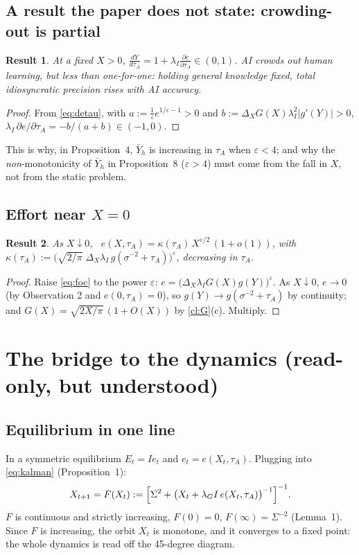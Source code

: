 \documentclass[11pt,a4paper]{article}
\newtheorem{result}{Result}
\theoremstyle{definition}
\theoremstyle{remark}
\newcommand{\tA}{\tau_A}
\newcommand{\lI}{\lambda_I}
\newcommand{\lG}{\lambda_G}
\begin{document}
\subsection{A result the paper does not state: crowding-out is partial}
\begin{result}\label{res:partial}
At a fixed $X>0$, $\displaystyle \frac{dY}{d\tA}=1+\lI\frac{\partial e}{\partial\tA}\in(0,1)$.
AI crowds out human learning, but less than one-for-one: holding general knowledge fixed, total
idiosyncratic precision rises with AI accuracy.
\end{result}
\begin{proof}
From \eqref{eq:detau}, with $a:=\tfrac1\varepsilon e^{1/\varepsilon-1}>0$ and $b:=\Delta_XG(X)\lI^2|g'(Y)|>0$,
$\lI\,\partial e/\partial\tA=-b/(a+b)\in(-1,0)$.
\end{proof}
\noindent This is why, in Proposition~4, $\bar Y_h$ is increasing in $\tA$ when $\varepsilon<4$; and why the
\emph{non}-monotonicity of $\bar Y_h$ in Proposition~8 ($\varepsilon>4$) must come from the fall in $X$, not
from the static problem.

\subsection{Effort near $X=0$}
\begin{result}\label{res:small}
As $X\downarrow0$, \ $e(X,\tA)=\kappa(\tA)\,X^{\varepsilon/2}\,(1+o(1))$, with
$\kappa(\tA):=\bigl(\sqrt{2/\pi}\;\Delta_X\lI\,g(\sigma^{-2}+\tA)\bigr)^{\varepsilon}$, decreasing in $\tA$.
\end{result}
\begin{proof}
Raise \eqref{eq:foc} to the power $\varepsilon$: $e=\bigl(\Delta_X\lI G(X)g(Y)\bigr)^\varepsilon$. As
$X\downarrow0$, $e\to0$ (by Observation 2 and $e(0,\tA)=0$), so $g(Y)\to g(\sigma^{-2}+\tA)$ by continuity; and
$G(X)=\sqrt{2X/\pi}\,(1+O(X))$ by \cref{cl:G}(c). Multiply.
\end{proof}

\section{The bridge to the dynamics (read-only, but understood)}

\subsection{Equilibrium in one line}
In a symmetric equilibrium $E_t=Ie_t$ and $e_t=e(X_t,\tA)$. Plugging into \eqref{eq:kalman}
(Proposition~1):
\[
X_{t+1}=F(X_t):=\Bigl[\Sigma^2+\bigl(X_t+\lG I\,e(X_t,\tA)\bigr)^{-1}\Bigr]^{-1}.
\]
$F$ is continuous and strictly increasing, $F(0)=0$, $F(\infty)=\Sigma^{-2}$ (Lemma~1). Since $F$ is
increasing, the orbit $X_t$ is monotone, and it converges to a fixed point: the whole dynamics is read off
the 45-degree diagram.
\end{document}
